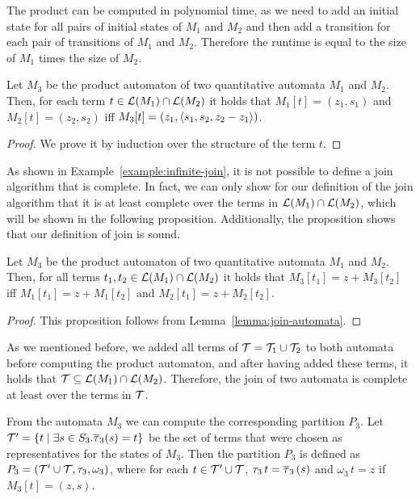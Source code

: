 The product can be computed in polynomial time, as we need to add an initial state for all pairs of initial states of $M_1$ and $M_2$ and then add a transition for each pair of transitions of $M_1$ and $M_2$. Therefore the runtime is equal to the size of $M_1$ times the size of $M_2$.

\begin{lemma}\label{lemma:join-automata}
    Let $M_3$ be the product automaton of two quantitative automata $M_1$ and $M_2$.
    Then, for each term $t \in \mathcal{L}(M_1) \cap \mathcal{L}(M_2)$ it holds that $M_1[t] = (z_1, s_1)$ and $M_2[t] = (z_2, s_2)$ iff $M_3[t] = (z_1, \langle s_1, s_2, z_2 - z_1\rangle)$.
\end{lemma}
\begin{proof}
    We prove it by induction over the structure of the term $t$.
\end{proof}

As shown in Example~\ref{example:infinite-join}, it is not possible to define a join algorithm that is complete.
In fact, we can only show for our definition of the join algorithm that it is at least complete over the terms in $\mathcal{L}(M_1) \cap \mathcal{L}(M_2)$, which will be shown in the following proposition.
Additionally, the proposition shows that our definition of join is sound.

\begin{proposition}\label{prop:join-automata}
    Let $M_3$ be the product automaton of two quantitative automata $M_1$ and $M_2$.
    Then, for all terms $t_1, t_2 \in \mathcal{L}(M_1) \cap \mathcal{L}(M_2)$ it holds that $M_3[t_1] = z + M_3[t_2]$ iff $M_1[t_1] = z + M_1[t_2]$ and $M_2[t_1] = z + M_2[t_2]$.
\end{proposition}
\begin{proof}
    This proposition follows from Lemma~\ref{lemma:join-automata}.
\end{proof}

As we mentioned before, we added all terms of $\mathcal{T} = \mathcal{T}_1 \cup \mathcal{T}_2$ to both automata before computing the product automaton, and after having added these terms, it holds that $\mathcal{T} \subseteq \mathcal{L}(M_1) \cap \mathcal{L}(M_2)$.
Therefore, the join of two automata is complete at least over the terms in $\mathcal{T}$.

From the automata $M_3$ we can compute the corresponding partition $P_3$.
Let $\mathcal{T}' = \{t \mid \exists s \in S_3 . \overline{\tau}_3(s) = t\}$ be the set of terms that were chosen
as representatives for the states of $M_3$.
Then the partition $P_3$ is defined as $P_3 = (\mathcal{T}' \cup \mathcal{T}, \tau_3, \omega_3)$,
where for each $t \in \mathcal{T}' \cup \mathcal{T}$, $\tau_3\,t = \overline{\tau}_3\,(s)$ and $\omega_3\,t = z$ if $M_3[t] = (z,s)$.

